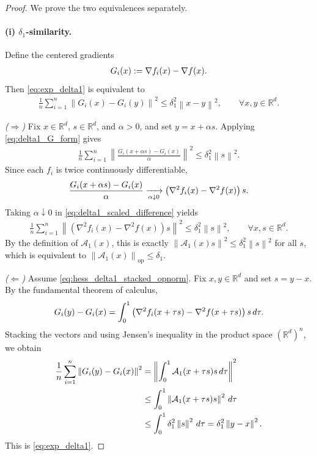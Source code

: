 \documentclass{article}
\newcommand{\bb}{\mathbb}
\newcommand{\op}{\operatorname{op}}
\newcommand{\R}{\bb R}
\newcommand{\sqn}[1]{\left\| #1 \right\|^2}
\newcommand{\opnorm}[1]{\left\| #1 \right\|_{\op}}      %
\newcommand{\eqdef}{:=}
\newcommand{\rb}[1]{\left(#1\right)}
\theoremstyle{plain}
\begin{document}
\begin{proof}
We prove the two equivalences separately.

\paragraph{(i) $\delta_1$-similarity.}
Define the centered gradients
\begin{align}
    G_i(x)\eqdef \nabla f_i(x)-\nabla f(x).
    \notag
\end{align}
Then \eqref{eq:exp_delta1} is equivalent to
\begin{align}
    \frac1n\sum_{i=1}^n
    \sqn{G_i(x)-G_i(y)}
    \le
    \delta_1^2\sqn{x-y},
    \qquad
    \forall x,y\in\R^d .
    \label{eq:delta1_G_form}
\end{align}

\smallskip
\noindent
\emph{($\Rightarrow$)}
Fix $x\in\R^d$, $s\in\R^d$, and $\alpha>0$, and set
$y=x+\alpha s$. Applying \eqref{eq:delta1_G_form} gives
\begin{align}
    \frac1n\sum_{i=1}^n
    \sqn{
    \frac{G_i(x+\alpha s)-G_i(x)}{\alpha}}
    \le
    \delta_1^2\sqn{s}.
    \label{eq:delta1_scaled_difference}
\end{align}
Since each $f_i$ is twice continuously differentiable,
\begin{align}
    \frac{G_i(x+\alpha s)-G_i(x)}{\alpha}
    \xrightarrow[\alpha\downarrow 0]{}
    \rb{\nabla^2 f_i(x)-\nabla^2 f(x)}s .
    \notag
\end{align}
Taking $\alpha\downarrow 0$ in \eqref{eq:delta1_scaled_difference} yields
\begin{align}
    \frac1n\sum_{i=1}^n
    \sqn{
    \rb{\nabla^2 f_i(x)-\nabla^2 f(x)}s}
    \le
    \delta_1^2\sqn{s},
    \qquad
    \forall x,s\in\R^d .
    \label{eq:delta1_directional_hessian}
\end{align}
By the definition of $\mathcal{A}_1(x)$, this is exactly
$\sqn{\mathcal{A}_1(x)s}\le \delta_1^2\sqn{s}$ for all $s$,
which is equivalent to $\opnorm{\mathcal{A}_1(x)}\le \delta_1$.

\smallskip
\noindent
\emph{($\Leftarrow$)}
Assume \eqref{eq:hess_delta1_stacked_opnorm}. Fix $x,y\in\R^d$
and set $s=y-x$. By the fundamental theorem of calculus,
\begin{align}
    G_i(y)-G_i(x)
    =
    \int_0^1
    \rb{\nabla^2 f_i(x+\tau s)-\nabla^2 f(x+\tau s)}s
    \,d\tau .
    \notag
\end{align}
Stacking the vectors and using Jensen's inequality in the product space
$(\R^d)^n$, we obtain
\begin{align}
    \frac1n\sum_{i=1}^n \sqn{G_i(y)-G_i(x)}
    &=
    \sqn{
    \int_0^1
    \mathcal{A}_1(x+\tau s)s
    \,d\tau}
    \notag
    \\
    &\le
    \int_0^1
    \sqn{\mathcal{A}_1(x+\tau s)s}
    \,d\tau
    \notag
    \\
    &\le
    \int_0^1
    \delta_1^2\sqn{s}
    \,d\tau
    =
    \delta_1^2\sqn{y-x}.
    \notag
\end{align}
This is \eqref{eq:exp_delta1}.


\end{proof}
\end{document}
